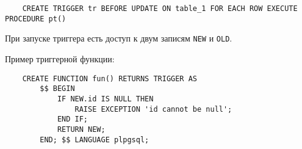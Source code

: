 \begin{verbatim}
	CREATE TRIGGER tr BEFORE UPDATE ON table_1 FOR EACH ROW EXECUTE PROCEDURE pt()
\end{verbatim}

При запуске триггера есть доступ к двум записям \texttt{NEW} и \texttt{OLD}.

Пример триггерной функции:
\begin{verbatim}
	CREATE FUNCTION fun() RETURNS TRIGGER AS
		$$ BEGIN
			IF NEW.id IS NULL THEN
				RAISE EXCEPTION 'id cannot be null';
			END IF;
			RETURN NEW;
		END; $$ LANGUAGE plpgsql;
\end{verbatim}
